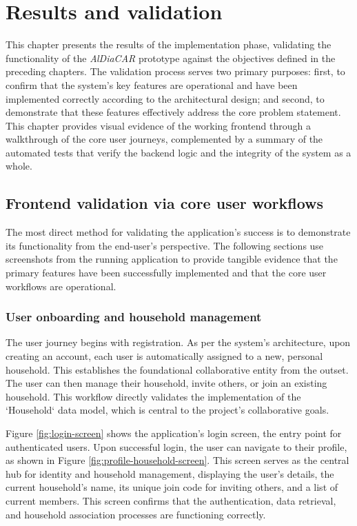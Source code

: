 \chapter{Results and validation}

This chapter presents the results of the implementation phase, validating the functionality of the \textit{AlDiaCAR} prototype against the objectives defined in the preceding chapters. The validation process serves two primary purposes: first, to confirm that the system's key features are operational and have been implemented correctly according to the architectural design; and second, to demonstrate that these features effectively address the core problem statement. This chapter provides visual evidence of the working frontend through a walkthrough of the core user journeys, complemented by a summary of the automated tests that verify the backend logic and the integrity of the system as a whole.

\section{Frontend validation via core user workflows}

The most direct method for validating the application's success is to demonstrate its functionality from the end-user's perspective. The following sections use screenshots from the running application to provide tangible evidence that the primary features have been successfully implemented and that the core user workflows are operational.

\subsection{User onboarding and household management}
The user journey begins with registration. As per the system's architecture, upon creating an account, each user is automatically assigned to a new, personal household. This establishes the foundational collaborative entity from the outset. The user can then manage their household, invite others, or join an existing household. This workflow directly validates the implementation of the `Household` data model, which is central to the project's collaborative goals.

\textgap

Figure \ref{fig:login-screen} shows the application's login screen, the entry point for authenticated users. Upon successful login, the user can navigate to their profile, as shown in Figure \ref{fig:profile-household-screen}. This screen serves as the central hub for identity and household management, displaying the user's details, the current household's name, its unique join code for inviting others, and a list of current members. This screen confirms that the authentication, data retrieval, and household association processes are functioning correctly.

